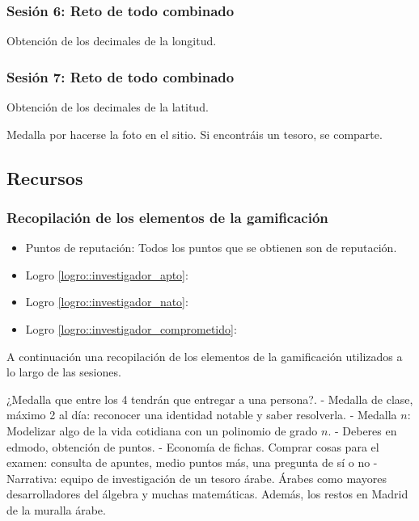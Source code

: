 \subsubsection{Sesión 6: Reto de todo combinado}

Obtención de los decimales de la longitud.

\subsubsection{Sesión 7: Reto de todo combinado}

Obtención de los decimales de la latitud.

Medalla por hacerse la foto en el sitio.
%
Si encontráis un tesoro, se comparte.


\subsection{Recursos}

\subsubsection{Recopilación de los elementos de la gamificación }

\begin{itemize}
	\item Puntos de reputación: Todos los puntos que se obtienen son de reputación.
	\item Logro \ref{logro::investigador_apto}:
	\item Logro \ref{logro::investigador_nato}:
	\item Logro \ref{logro::investigador_comprometido}:

\end{itemize}


A continuación una recopilación de los elementos de la gamificación utilizados a lo largo de las sesiones.

¿Medalla que entre los 4 tendrán que entregar a una persona?. 
- Medalla de clase, máximo 2 al día: reconocer una identidad notable y saber resolverla.
- Medalla $n$: Modelizar algo de la vida cotidiana con un polinomio de grado $n$.
- Deberes en edmodo, obtención de puntos. 
- Economía de fichas. Comprar cosas para el examen: consulta de apuntes, medio puntos más, una pregunta de sí o no 
- Narrativa: equipo de investigación de un tesoro árabe. Árabes como mayores desarrolladores del álgebra y muchas matemáticas.
%
Además, los restos en Madrid de la muralla árabe.


